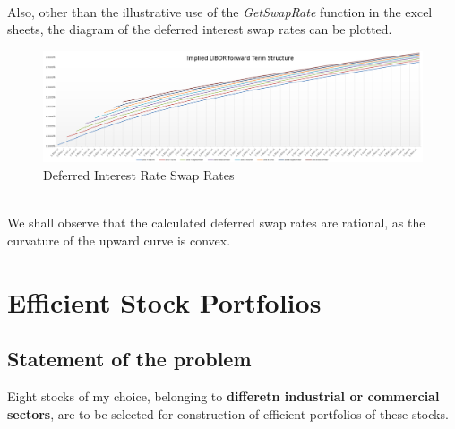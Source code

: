 \\Also, other than the illustrative use of the \emph{GetSwapRate} function in the excel sheets, the diagram of the deferred interest swap rates can be plotted.
\begin{figure}[h]
	\centering
	\includegraphics[scale=0.4]{biu.PNG}
	\caption{Deferred Interest Rate Swap Rates}
\end{figure}
\\We shall observe that the calculated deferred swap rates are rational, as the curvature of the upward curve is convex.
\newpage

\section{Efficient Stock Portfolios}
\subsection*{Statement of the problem}
Eight stocks of my choice, belonging to \textbf{differetn industrial or commercial sectors}, are to be selected for construction of efficient portfolios of these stocks.
